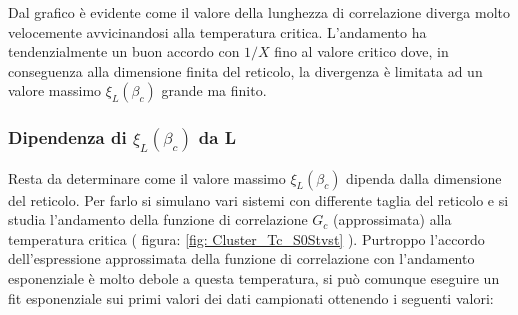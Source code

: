 Dal grafico è evidente come il valore della lunghezza di correlazione diverga molto velocemente avvicinandosi alla temperatura critica.
L'andamento ha tendenzialmente un buon accordo con $1/X$ fino al valore critico dove, in conseguenza alla dimensione finita del reticolo, la divergenza è limitata ad un valore massimo $\xi_L(\beta_c)$ grande ma finito.

\subsubsection*{Dipendenza di $\xi_L(\beta_c)$ da L}
Resta da determinare come il valore massimo $\xi_L(\beta_c)$ dipenda dalla dimensione del reticolo.
Per farlo si simulano vari sistemi con differente taglia del reticolo e si studia l'andamento della funzione di correlazione $G_c$ (approssimata) alla temperatura critica ( figura: \ref{fig: Cluster_Tc_S0Stvst} ).
Purtroppo l'accordo dell'espressione approssimata della funzione di correlazione con l'andamento esponenziale è molto debole a questa temperatura, si può comunque eseguire un fit esponenziale sui primi valori dei dati campionati ottenendo i seguenti valori:


